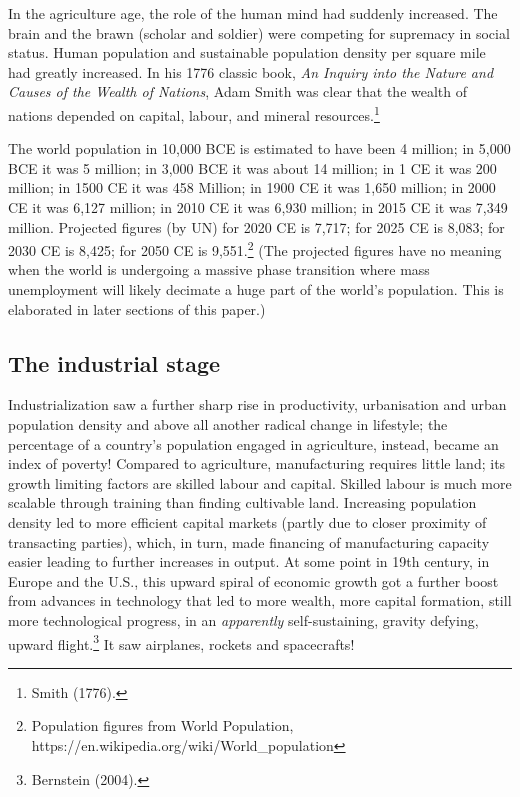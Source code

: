 \begin{multicols}{2}
In the agriculture age, the role of the human mind had suddenly increased. The brain and the brawn (scholar and soldier) were competing for supremacy in social status. Human population and sustainable population density per square mile had greatly increased. In his 1776 classic book, \textit{An Inquiry into the Nature and Causes of the Wealth of Nations}, Adam Smith was clear that the wealth of nations depended on capital, labour, and mineral resources.\footnote{Smith (1776).}

The world population in 10,000 BCE is estimated to have been 4 million; in 5,000 BCE it was 5 million; in 3,000 BCE it was about 14 million; in 1 CE it was 200 million; in 1500 CE it was 458 Million; in 1900 CE it was 1,650 million; in 2000 CE it was 6,127 million; in 2010 CE it was 6,930 million; in 2015 CE it was 7,349 million. Projected figures (by UN) for 2020 CE is 7,717; for 2025 CE is 8,083; for 2030 CE is 8,425; for 2050 CE is 9,551.\footnote{Population figures from World Population, https://en.wikipedia.org/wiki/World\_population}  (The projected figures have no meaning when the world is undergoing a massive phase transition where mass unemployment will likely decimate a huge part of the world's population. This is elaborated in later sections of this paper.)

\subsection{The industrial stage}

Industrialization saw a further sharp rise in productivity, urbanisation and urban population density and above all another radical change in lifestyle; the percentage of a country's population engaged in agriculture, instead, became an index of poverty! Compared to agriculture, manufacturing requires little land; its growth limiting factors are skilled labour and capital. Skilled labour is much more scalable through training than finding cultivable land. Increasing population density led to more efficient capital markets (partly due to closer proximity of transacting parties), which, in turn, made financing of manufacturing capacity easier leading to further increases in output. At some point in 19th century, in Europe and the U.S., this upward spiral of economic growth got a further boost from advances in technology that led to more wealth, more capital formation, still more technological progress, in an \textit{apparently} self-sustaining, gravity defying, upward flight.\footnote{Bernstein (2004).} It saw airplanes, rockets and spacecrafts!


\end{multicols}
